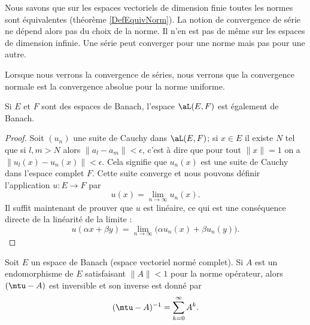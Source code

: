 \begin{remark}
    Nous savons que sur les espaces vectoriels de dimension finie toutes les normes sont équivalentes (théorème \ref{DefEquivNorm}). La notion de convergence de série ne dépend alors pas du choix de la norme. Il n'en est pas de même sur les espaces de dimension infinie. Une série peut converger pour une norme mais pas pour une autre.
\end{remark}
Lorsque nous verrons la convergence de séries, nous verrons que la convergence normale est la convergence absolue pour la norme uniforme.

\begin{lemma}       \label{LemCAIPooPMNbXg}
    Si \( E\) et \( F\) sont des espaces de Banach, l'espace \( \aL(E,F)\) est également de Banach.
\end{lemma}

\begin{proof}
    Soit \( (u_n)\) une suite de Cauchy dans \( \aL(E,F)\); si \( x\in E\) il existe \( N\) tel que si \( l,m>N\) alors \( \| a_l-a_m \|<\epsilon\), c'est à dire que pour tout \( \| x \|=1\) on a \( \| u_l(x)-u_n(x) \|<\epsilon\). Cela signifie que \( u_n(x)\) est une suite de Cauchy dans l'espace complet \( F\). Cette suite converge et nous pouvons définir l'application \( u\colon E\to F\) par
    \begin{equation}
        u(x)=\lim_{n\to \infty} u_n(x).
    \end{equation}
    Il suffit maintenant de prouver que \( u\) est linéaire, ce qui est une conséquence directe de la linéarité de la limite :
    \begin{equation}
        u(\alpha x+\beta y)=\lim_{n\to \infty} \big( \alpha u_n(x)+\beta u_n(y) \big).
    \end{equation}
\end{proof}

\begin{proposition}     \label{PropQAjqUNp}
    Soit \( E\) un espace de Banach (espace vectoriel normé complet). Si \( A\) est un endomorphisme de \( E\) satisfaisant  \( \| A \|<1\) pour la norme opérateur, alors \( (\mtu-A)\) est inversible et son inverse est donné par
    \begin{equation}
        (\mtu-A)^{-1}=\sum_{k=0}^{\infty}A^k.
    \end{equation}
\end{proposition}

